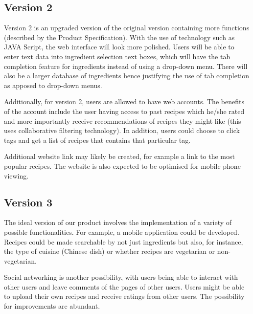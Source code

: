\subsection{Version 2}
Version 2 is an upgraded version of the original version containing more functions (described by the Product Specification). With the use of technology such as JAVA Script, the web interface will look more polished. Users will be able to enter text data into ingredient selection text boxes, which will have the tab completion feature for ingredients instead of using a drop-down menu. There will also be a larger database of ingredients hence justifying the use of tab completion as apposed to drop-down menus.

Additionally, for version 2, users are allowed to have web accounts. The benefits of the account include the user having access to past recipes which he/she rated and more importantly receive recommendations of recipes they might like (this uses collaborative filtering technology). In addition, users could choose to click tags and get a list of recipes that contains that particular tag.

Additional website link may likely be created, for example a link to the most popular recipes. The website is also expected to be optimised for mobile phone viewing.

\subsection{Version 3}
The ideal version of our product involves the implementation of a variety of possible functionalities. For example, a mobile application could be developed. Recipes could be made searchable by not just ingredients but also, for instance, the type of cuisine (Chinese dish) or whether recipes are vegetarian or non-vegetarian. 

Social networking is another possibility, with users being able to interact with other users and leave comments of the pages of other users. Users might be able to upload their own recipes and receive ratings from other users. The possibility for improvements are abundant.
